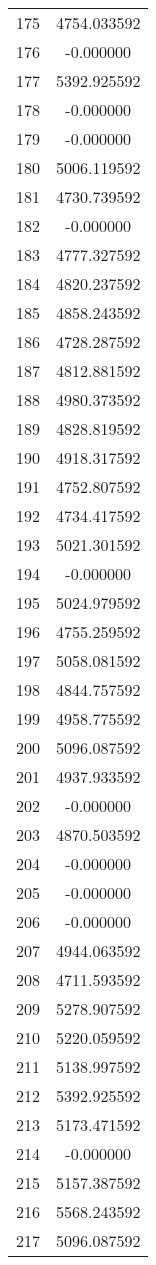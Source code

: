 \documentclass[12pt]{article}
\begin{document}
\begin{longtable}{@{}cc@{}}
175 & 4754.033592 \\
176 & -0.000000 \\
177 & 5392.925592 \\
178 & -0.000000 \\
179 & -0.000000 \\
180 & 5006.119592 \\
181 & 4730.739592 \\
182 & -0.000000 \\
183 & 4777.327592 \\
184 & 4820.237592 \\
185 & 4858.243592 \\
186 & 4728.287592 \\
187 & 4812.881592 \\
188 & 4980.373592 \\
189 & 4828.819592 \\
190 & 4918.317592 \\
191 & 4752.807592 \\
192 & 4734.417592 \\
193 & 5021.301592 \\
194 & -0.000000 \\
195 & 5024.979592 \\
196 & 4755.259592 \\
197 & 5058.081592 \\
198 & 4844.757592 \\
199 & 4958.775592 \\
200 & 5096.087592 \\
201 & 4937.933592 \\
202 & -0.000000 \\
203 & 4870.503592 \\
204 & -0.000000 \\
205 & -0.000000 \\
206 & -0.000000 \\
207 & 4944.063592 \\
208 & 4711.593592 \\
209 & 5278.907592 \\
210 & 5220.059592 \\
211 & 5138.997592 \\
212 & 5392.925592 \\
213 & 5173.471592 \\
214 & -0.000000 \\
215 & 5157.387592 \\
216 & 5568.243592 \\
217 & 5096.087592 \\

\end{longtable}
\end{document}
